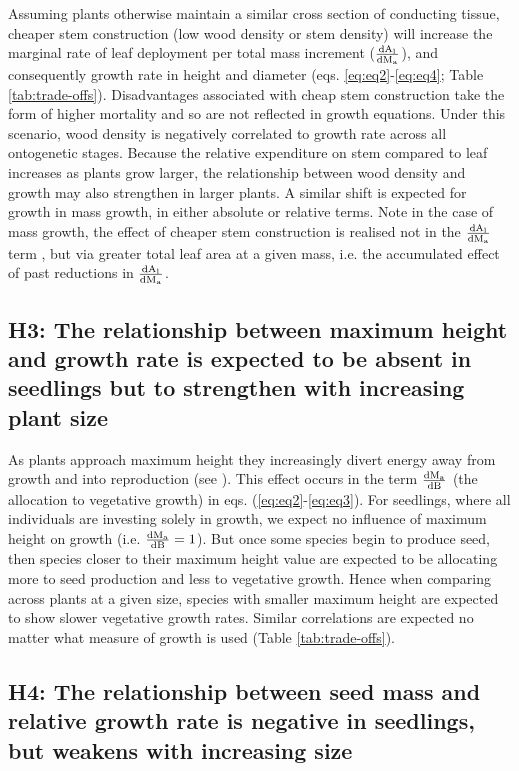 \documentclass[a4paper,11pt]{article}
\begin{document}
Assuming plants otherwise maintain a similar cross section of conducting tissue, cheaper stem construction (low wood density or stem density) will increase the marginal rate of leaf deployment per total mass increment ($\frac{\rm{d} A_{\rm l}}{\rm{d} M_{\rm a} }$), and consequently growth rate in height and diameter (eqs. \ref{eq:eq2}-\ref{eq:eq4}; Table \ref{tab:trade-offs}). Disadvantages associated with cheap stem construction take the form of higher mortality and so are not reflected in growth equations. Under this scenario, wood density is negatively correlated to growth rate across all ontogenetic stages. Because the relative expenditure on stem compared to leaf increases as plants grow larger, the relationship between wood density and growth may also strengthen in larger plants. A similar shift is expected for growth in mass growth, in either absolute or relative terms. Note in the case of mass growth, the effect of cheaper stem construction is realised not in the $\frac{\rm{d} A_{\rm l}}{\rm{d} M_{\rm a} }$ term , but via greater total leaf area at a given mass, i.e. the accumulated effect of past reductions in  $\frac{\rm{d} A_{\rm l}}{\rm{d} M_{\rm a} }$.

\subsection*{H3: The relationship between maximum height and growth rate is expected to be absent in seedlings but to strengthen with increasing plant size}

As plants approach maximum height they increasingly divert energy away from growth and into reproduction (see \citealt{Thomas:1996do,Thomas-2011, Wenk:2015jz}). This effect occurs in the term $\frac{\rm{d} M_{\rm a} }{\rm{d} B}$ (the allocation to vegetative growth) in eqs. (\ref{eq:eq2}-\ref{eq:eq3}). For seedlings, where all individuals are investing solely in growth, we expect no influence of maximum height on growth (i.e. $\frac{\rm{d} M_{\rm a} }{\rm{d} B} =1$). But once some species begin to produce seed, then species closer to their maximum height value are expected to be allocating more to seed production and less to vegetative growth. Hence when comparing across plants at a given size, species with smaller maximum height are expected to show slower vegetative growth rates. Similar correlations are expected no matter what measure of growth is used (Table \ref{tab:trade-offs}).

\subsection*{H4: The relationship between seed mass and relative growth rate is negative in seedlings, but weakens with increasing size}
\end{document}
